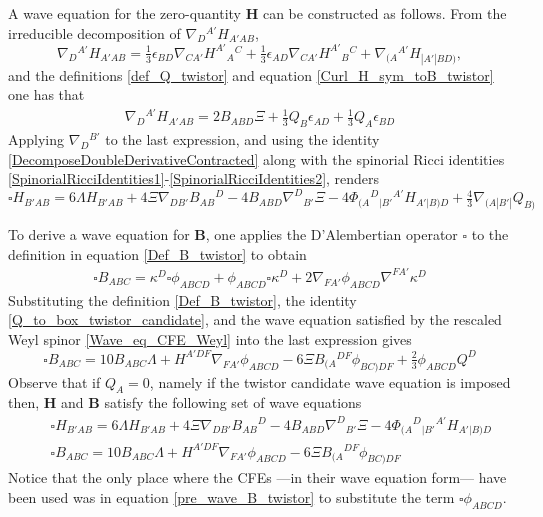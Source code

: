 \documentclass[10pt,a4paper]{article}
\theoremstyle{plain}
\def\bmB{{\bm B}}
\def\bmH{{\bm H}}
\begin{document}
A wave equation for the zero-quantity $\bmH$ can be constructed as
follows.  From the irreducible decomposition of
$\nabla_D{}^{A'}H_{A'AB}$,
\[
\nabla_{D}{}^{A'}H_{A'AB} = \tfrac{1}{3} \epsilon _{BD}
\nabla_{CA'}H^{A'}{}_{A}{}^{C} + \tfrac{1}{3} \epsilon _{AD}
\nabla_{CA'}H^{A'}{}_{B}{}^{C} + \nabla_{(A}{}^{A'}H_{|A'|BD)},
\]
and the definitions \eqref{def_Q_twistor} and equation
\eqref{Curl_H_sym_toB_twistor} one has that
\begin{align}\label{derH_twistor_toBandQ}
\nabla_{D}{}^{A'}H_{A'AB} = 2 B_{ABD} \Xi + \tfrac{1}{3} Q_{B}
\epsilon _{AD} + \tfrac{1}{3} Q_{A} \epsilon _{BD}
\end{align}
Applying $\nabla_{D}{}^{B'}$ to the last expression, and using the
identity \eqref{DecomposeDoubleDerivativeContracted} along with the
spinorial Ricci identities
\eqref{SpinorialRicciIdentities1}-\eqref{SpinorialRicciIdentities2},
renders
\begin{equation}\label{wave_H_twistor}
  \square H_{B'AB} = 6 \Lambda H_{B'AB} + 4 \Xi
  \nabla_{DB'}B_{AB}{}^{D} -4 B_{ABD} \nabla^{D}{}_{B'}\Xi -4
  \Phi_{(A}{}^{D}{}_{|B'}{}^{A'}H_{A'|B)D} + \tfrac{4}{3}
  \nabla_{(A|B'|}Q_{B)}
\end{equation}

\noindent To derive a wave equation for $\bmB$, one applies the D'Alembertian operator
$\square$ to the definition in equation \eqref{Def_B_twistor} to obtain
\begin{align}\label{pre_wave_B_twistor}
\square B_{ABC} = \kappa ^{D} \square \phi _{ABCD} + \phi _{ABCD}
\square \kappa ^{D} + 2 \nabla_{FA'}\phi _{ABCD} \nabla^{FA'}\kappa
^{D}
\end{align}
Substituting the definition \eqref{Def_B_twistor}, the identity
\eqref{Q_to_box_twistor_candidate}, and the wave equation satisfied by
the rescaled Weyl spinor \eqref{Wave_eq_CFE_Weyl} into the last expression gives
\begin{equation}\label{wave_B_twistor}
\square B_{ABC} = 10 B_{ABC} \Lambda + H^{A'DF} \nabla_{FA'}\phi _{ABCD}  -6 \Xi B_{(A}{}^{DF}\phi
_{BC)DF} + \tfrac{2}{3} \phi _{ABCD} Q^{D}
\end{equation}
Observe that if $Q_{A}=0$, namely if the twistor candidate wave equation is imposed then,
$\bmH$ and $\bmB$ satisfy the following set of wave equations
\begin{subequations}
\begin{eqnarray}
  && \square H_{B'AB} = 6 \Lambda H_{B'AB} + 4 \Xi
  \nabla_{DB'}B_{AB}{}^{D}  -4 B_{ABD} \nabla^{D}{}_{B'}\Xi   -4 \Phi_{(A}{}^{D}{}_{|B'}{}^{A'}H_{A'|B)D}
   \label{Hom_wave_HandB1} \\
 && \square B_{ABC} = 10 B_{ABC} \Lambda + H^{A'DF} \nabla_{FA'}\phi _{ABCD}  -6 \Xi B_{(A}{}^{DF}\phi
_{BC)DF}  \label{Hom_wave_HandB2}
\end{eqnarray}
\end{subequations}
Notice that the only place where the CFEs ---in their wave equation form---
have been used was in equation \eqref{pre_wave_B_twistor}
to substitute the term $\square \phi _{ABCD}$.
\end{document}
